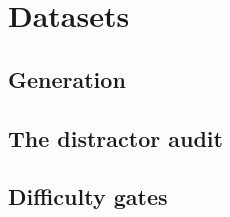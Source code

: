 \section{Datasets}
\label{sec:datasets}


\subsection{Generation}

\subsection{The distractor audit}
%

\subsection{Difficulty gates}
%

